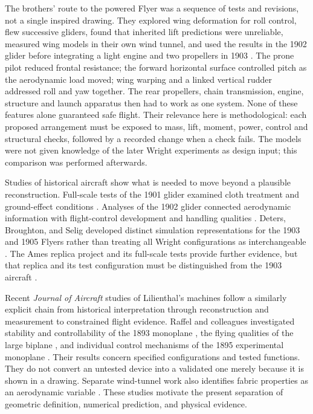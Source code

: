 \documentclass[10pt,letterpaper]{article}
\begin{document}
The brothers' route to the powered Flyer was a sequence of tests and revisions, not a single inspired drawing. They explored wing deformation for roll control, flew successive gliders, found that inherited lift predictions were unreliable, measured wing models in their own wind tunnel, and used the results in the 1902 glider before integrating a light engine and two propellers in 1903 \cite{ref2,ref35}. The prone pilot reduced frontal resistance; the forward horizontal surface controlled pitch as the aerodynamic load moved; wing warping and a linked vertical rudder addressed roll and yaw together. The rear propellers, chain transmission, engine, structure and launch apparatus then had to work as one system. None of these features alone guaranteed safe flight. Their relevance here is methodological: each proposed arrangement must be exposed to mass, lift, moment, power, control and structural checks, followed by a recorded change when a check fails. The models were not given knowledge of the later Wright experiments as design input; this comparison was performed afterwards.

Studies of historical aircraft show what is needed to move beyond a plausible reconstruction. Full-scale tests of the 1901 glider examined cloth treatment and ground-effect conditions \cite{ref8}. Analyses of the 1902 glider connected aerodynamic information with flight-control development and handling qualities \cite{ref7,ref9}. Deters, Broughton, and Selig developed distinct simulation representations for the 1903 and 1905 Flyers rather than treating all Wright configurations as interchangeable \cite{ref11}. The Ames replica project and its full-scale tests provide further evidence, but that replica and its test configuration must be distinguished from the 1903 aircraft \cite{ref12,ref13}.

Recent \emph{Journal of Aircraft} studies of Lilienthal's machines follow a similarly explicit chain from historical interpretation through reconstruction and measurement to constrained flight evidence. Raffel and colleagues investigated stability and controllability of the 1893 monoplane \cite{ref16}, the flying qualities of the large biplane \cite{ref17}, and individual control mechanisms of the 1895 experimental monoplane \cite{ref18}. Their results concern specified configurations and tested functions. They do not convert an untested device into a validated one merely because it is shown in a drawing. Separate wind-tunnel work also identifies fabric properties as an aerodynamic variable \cite{ref19}. These studies motivate the present separation of geometric definition, numerical prediction, and physical evidence.
\end{document}
